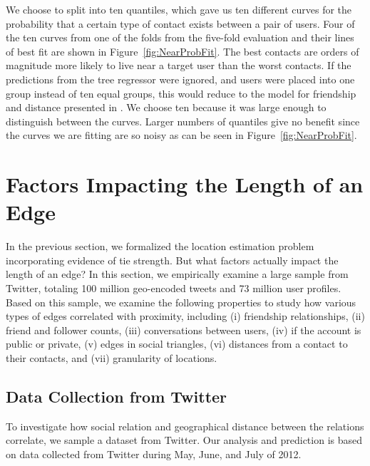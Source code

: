\documentclass{sig-alternate}
\begin{document}
We choose to split into ten quantiles, which gave us ten different curves for
the probability that a certain type of contact exists between a pair of users.
%
Four of the ten curves from one of the folds from the five-fold evaluation and
their lines of best fit are shown in Figure~\ref{fig:NearProbFit}.
%
The best contacts are orders of magnitude more likely to live near a target
user than the worst contacts.
%
If the predictions from the tree regressor were ignored, and users were placed
into one group instead of ten equal groups, this would reduce to the model for
friendship and distance presented in \cite{backstrom2010find}.
%
We choose ten because it was large enough to distinguish between the curves.
%
Larger numbers of quantiles give no benefit since the curves we are fitting
are so noisy as can be seen in Figure~\ref{fig:NearProbFit}.


\section{Factors Impacting the Length of an Edge}
In the previous section, we formalized the location estimation problem
incorporating evidence of tie strength.
%
But what factors actually impact the length of an edge? In this section, we
empirically examine a large sample from Twitter, totaling 100 million
geo-encoded tweets and 73 million user profiles.
%
Based on this sample, we examine the following properties to study how various
types of edges correlated with proximity, including
    (i) friendship relationships,
    (ii) friend and follower counts,
    (iii) conversations between users,
    (iv) if the account is public or private,
    (v) edges in social triangles,
    (vi) distances from a contact to their contacts, and
    (vii) granularity of locations.

\subsection{Data Collection from Twitter}
To investigate how social relation and geographical distance between the
relations correlate, we sample a dataset from Twitter.
%
Our analysis and prediction is based on data collected from Twitter during
May, June, and July of 2012.
\end{document}
